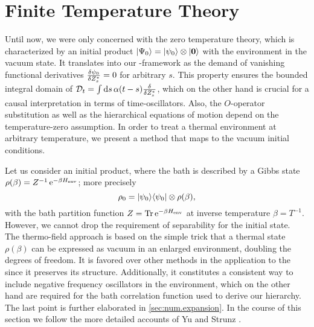 \section{Finite Temperature Theory}
\label{sec:nmqsd.temperature}
%

Until now, we were only concerned with the zero temperature theory, which is characterized by an initial product $| \Psi_0 \rangle = | \psi_0 \rangle \otimes | \boldsymbol{0} \rangle$ with the environment in the vacuum state.
It translates into our \NMSSE-framework as the demand of vanishing functional derivatives $\frac{\delta \psi_0}{\delta {Z}^*_s} = 0$ for arbitrary $s$.
This property ensures the bounded integral domain of $\mathcal{D}_t = \int\mathrm{d}s \, \alpha(t-s) \frac{\delta}{\delta {Z}^*_s}$, which on the other hand is crucial for a causal interpretation in terms of time-oscillators.
Also, the $O$-operator substitution as well as the hierarchical equations of motion depend on the temperature-zero assumption.
In order to treat a thermal environment at arbitrary temperature, we present a method that maps to the vacuum initial conditions.

Let us consider an initial product, where the bath is described by a Gibbs state $\rho(\beta) = Z^{-1} \, \exp[-\beta \Henv]$; more precisely
\begin{equation}
  \rho_0 = | \psi_0 \rangle\langle \psi_0 | \otimes \rho(\beta),
  \label{eq:nmqsd.initial_rho}
\end{equation}
with the bath partition function $Z = \Tr \exp[-\beta \Henv]$ at inverse temperature $\beta = T^{-1}$.
However, we cannot drop the requirement of separability for the initial state.\\



The thermo-field approach \cite{SeUm83_thermofield} is based on the simple trick that a thermal state $\rho(\beta)$ can be expressed as vacuum in an enlarged environment, doubling the degrees of freedom.
It is favored over other methods in the application to the \NMSSE since it preserves its structure.
Additionally, it constitutes a consistent way to include negative frequency oscillators in the environment, which on the other hand are required for the bath correlation function used to derive our hierarchy.
The last point is further elaborated in \autoref{sec:num.expansion}.
In the course of this section we follow the more detailed accounts of Yu and Strunz \cite{Yu04_heat_bath,St01_habil}.


